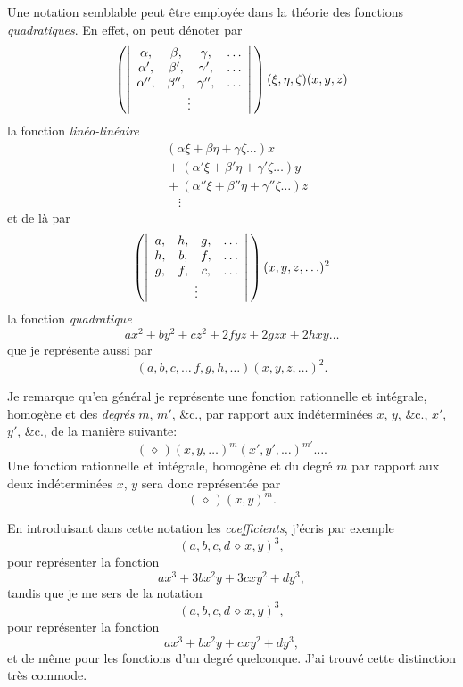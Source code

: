 \documentclass[11pt,a4paper]{article}
\begin{document}
\medskip

Une notation semblable peut \^etre employ\'ee dans la th\'eorie des fonctions \textit{quadratiques}. En effet, on peut d\'enoter par
\[
\left(\left\lvert\begin{array}{cccc}
\alpha , & \beta , & \gamma , & \ldots\\
\alpha', & \beta', & \gamma', & \ldots\\
\alpha'', & \beta'', & \gamma'', & \ldots\\
\multicolumn{4}{c}{\vdots}
\end{array}\right\rvert\,\right)(\xi,\eta,\zeta)(x,y,z)
\]
la fonction \textit{lin\'eo-lin\'eaire}
\begin{align*}
& (\alpha\xi + \beta\eta + \gamma\zeta \ldots) x\\
&{}+ (\alpha'\xi + \beta'\eta + \gamma'\zeta \ldots) y\\
&{}+ (\alpha''\xi + \beta''\eta + \gamma''\zeta \ldots) z\\
&\quad\vdots
\end{align*}
et de l\`a par
\[
\left(\left\lvert\begin{array}{cccc}
a , & h , & g , & \ldots\\
h , & b , & f , & \ldots\\
g , & f , & c , & \ldots\\
\multicolumn{4}{c}{\vdots}
\end{array}\right\rvert\,\right)(x,y,z,\ldots)^2
\]
la fonction \textit{quadratique}
\[
ax^2 + by^2 + cz^2 + 2fyz + 2gzx + 2hxy \ldots
\]
que je repr\'esente aussi par
\[
(a,b,c,\ldots\,f,g,h,\ldots)(x,y,z,\ldots)^2.
\]

\medskip

Je remarque qu'en g\'en\'eral je repr\'esente une fonction rationnelle et int\'egrale, homog\`ene et des \textit{degr\'es} $m$, $m'$, \&c., par rapport aux ind\'etermin\'ees $x$, $y$, \&c., $x'$, $y'$, \&c., de la mani\`ere suivante:
\[
(\,\diamond\,)(x,y,\ldots)^m (x',y',\ldots)^{m'} \ldots .
\]
Une fonction rationnelle et int\'egrale, homog\`ene et du degr\'e $m$ par rapport aux deux ind\'etermin\'ees $x$, $y$ sera donc repr\'esent\'ee par
\[
(\,\diamond\,)(x,y)^m .
\]

\medskip

En introduisant dans cette notation les \textit{coefficients}, j'\'ecris par exemple
\[
(a,b,c,d \,\diamond\, x,y)^3,
\]
pour repr\'esenter la fonction
\[
ax^3 + 3 b x^2 y + 3 c x y^2 + d y^3,
\]
tandis que je me sers de la notation
\[
(a,b,c,d \,\diamond\, x,y)^3,
\]
pour repr\'esenter la fonction
\[
ax^3 + b x^2 y + c x y^2 + d y^3,
\]
et de m\^eme pour les fonctions d'un degr\'e quelconque. J'ai trouv\'e cette distinction tr\`es commode.
\end{document}
